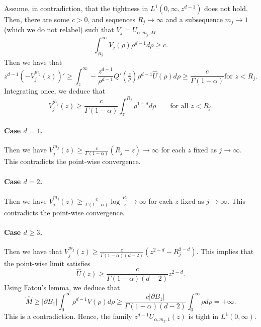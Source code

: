 \documentclass[a4paper]{article}
\theoremstyle{definition}
\begin{document}
%

%

%
%

%
%

%

%
%

%

%

%

%
%

%
%
%
%
%
%
%
%
%
%
%
%
%
%
%

%
Assume, in contradiction, that the tightness in $L^1(0,\infty, z^{d-1})$ does not hold. Then, there are some $c > 0$, and sequences $R_j \to \infty$ and a subsequence $m_j \to 1$ (which we do not relabel) such that $V_j = U_{\alpha,m_j,M}$
\begin{equation*}
\int_{R_j}^\infty V_j(\rho) \rho^{d-1} d \rho \ge c.
\end{equation*}
Then we have that
\begin{equation*}
z^{d-1}(-V_j^{m_j}(z))' \ge \int_z^\infty - \frac{z^{d-1}}{\rho^{d-1}}Q'(\tfrac{z}{\rho}) \rho^{d-1} \widehat{U}(\rho) d \rho \ge \frac{c}{\Gamma(1-\alpha)} \text{for } z < R_j.
\end{equation*}
Integrating once, we deduce that
\[
V_j^{m_j}(z) \ge \frac{c}{\Gamma(1-\alpha)} \int_{z}^{R_j} \rho^{1-d} d\rho \qquad \text{for all } z < R_j.
\]
\paragraph{Case $d=1$.} Then we have $V_j^{m_j}(z) \ge \frac{c}{\Gamma(1-\alpha)} (R_j - z) \to \infty$ for each $z$ fixed as $j \to \infty$. This contradicts the point-wise convergence.

\paragraph{Case $d=2$.} Then we have $V_j^{m_j}(z) \ge \frac{c}{\Gamma(1-\alpha)} \log \frac{R_j}{z} \to \infty$ for each $z$ fixed as $j \to \infty$. This contradicts the point-wise convergence.

\paragraph{Case $d \ge 3$.} Then we have that $V_j^{m_j}(z) \ge \frac{c}{\Gamma(1-\alpha)(d-2)}(z^{2-d} - R_j^{2-d})$.
This implies that the point-wise limit satisfies
\[
\widehat U (z) \ge \frac{c}{\Gamma(1-\alpha)(d-2)} z^{2-d}.
\]
Using Fatou's lemma, we deduce that
\[
\widehat M \ge |\partial B_1| \int_0^\infty \rho^{d-1} V(\rho) d\rho \ge \frac{c |\partial B_1|}{\Gamma(1-\alpha)(d-2)}\int_0^\infty \rho d \rho = +\infty.
\]
This is a contradiction. Hence, the family $z^{d-1} U_{\alpha,m_j,1}(z)$ is tight in $L^1(0,\infty)$.
\end{document}
